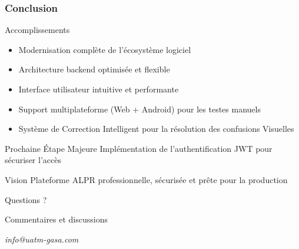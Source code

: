 \documentclass[
	11pt,
	aspectratio=169,
]{beamer}
\begin{document}
\begin{frame}
	\frametitle{Conclusion}
	
	\begin{block}{Accomplissements}
		\begin{itemize}
			\item Modernisation complète de l'écosystème logiciel
			\item Architecture backend optimisée et flexible
			\item Interface utilisateur intuitive et performante
			\item Support multiplateforme (Web + Android) pour les testes manuels
			\item Système de Correction Intelligent pour la résolution
			des confusions Visuelles
		\end{itemize}
	\end{block}
	
	\smallskip
	
	\begin{exampleblock}{Prochaine Étape Majeure}
		\centering
		Implémentation de l'authentification JWT pour sécuriser l'accès
	\end{exampleblock}
	
	\smallskip
	
	\begin{alertblock}{Vision}
		\centering
		Plateforme ALPR professionnelle, sécurisée et prête pour la production
	\end{alertblock}
\end{frame}




\begin{frame}[plain]
	\begin{center}
		{\Huge Questions ?}
		
		\bigskip\bigskip
		
		{\LARGE Commentaires et discussions}
		
		\bigskip\bigskip
		
		\textit{info@uatm-gasa.com}
	\end{center}
\end{frame}

\end{document}
